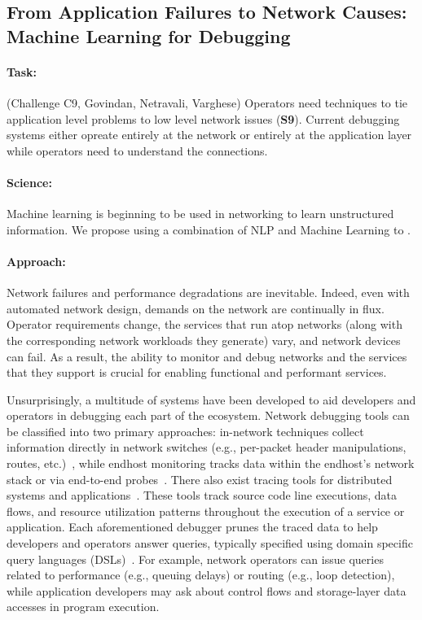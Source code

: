 
\subsection{From Application Failures to Network Causes: Machine Learning for Debugging}

\paragraph*{Task:} (Challenge C9, Govindan, Netravali, Varghese)  
Operators need techniques to tie application level problems to low level network issues (\textbf{S9}).
Current debugging systems either opreate entirely at the network or entirely at the application layer while
operators need to understand the connections.

\paragraph*{Science:} Machine learning is beginning to be used in networking to learn unstructured
information.  We propose using a combination of NLP and Machine Learning to .

\paragraph*{Approach:} 
Network failures and performance degradations are inevitable. Indeed, even with
automated network design, demands on the network are continually in flux.
Operator requirements change, the services that run atop networks (along with
the corresponding network workloads they generate) vary, and network devices
can fail. As a result, the ability to monitor and debug networks and the
services that they support is crucial for enabling functional and performant
services.

Unsurprisingly, a multitude of systems have been developed to aid developers
and operators in debugging each part of the ecosystem.  Network debugging tools
can be classified into two primary approaches: in-network techniques collect
information directly in network switches (e.g., per-packet header
manipulations, routes,
etc.)~\cite{xtrace,netsight,pathqueries,marple,sdndebug}, while endhost
monitoring tracks data within the endhost's network stack or via end-to-end
probes~\cite{trumpet,cherrypick,pathdump}.  There also exist tracing tools for
distributed systems and applications~\cite{pivot,polaris,demi,dapper}. These
tools track source code line executions, data flows, and resource utilization
patterns throughout the execution of a service or application. Each
aforementioned debugger prunes the traced data to help developers and operators
answer queries, typically specified using domain specific query languages
(DSLs)~\cite{bsd,pathqueries,marple}. For example, network operators can issue
queries related to performance (e.g., queuing delays) or routing (e.g., loop
detection), while application developers may ask about control flows and
storage-layer data accesses in program execution.

